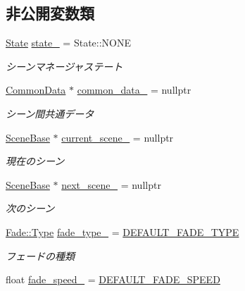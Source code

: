 \subsection*{非公開変数類}
\begin{DoxyCompactItemize}
\item 
\mbox{\hyperlink{class_scene_manager_a68d32794fe1ce945c6a6c380c11a08eb}{State}} \mbox{\hyperlink{class_scene_manager_adf81d8a63dee92bfe5bb934903542bec}{state\+\_\+}} = State\+::\+N\+O\+NE
\begin{DoxyCompactList}\small\item\em シーンマネージャステート \end{DoxyCompactList}\item 
\mbox{\hyperlink{class_scene_manager_1_1_common_data}{Common\+Data}} $\ast$ \mbox{\hyperlink{class_scene_manager_a5f0f0da3d7f9a8a94f0b5a20c3a4908a}{common\+\_\+data\+\_\+}} = nullptr
\begin{DoxyCompactList}\small\item\em シーン間共通データ \end{DoxyCompactList}\item 
\mbox{\hyperlink{class_scene_base}{Scene\+Base}} $\ast$ \mbox{\hyperlink{class_scene_manager_a62dd6d9d807f0a7f2ea4d014126b765e}{current\+\_\+scene\+\_\+}} = nullptr
\begin{DoxyCompactList}\small\item\em 現在のシーン \end{DoxyCompactList}\item 
\mbox{\hyperlink{class_scene_base}{Scene\+Base}} $\ast$ \mbox{\hyperlink{class_scene_manager_a7f9bb649125a114715b07154ac3df6ae}{next\+\_\+scene\+\_\+}} = nullptr
\begin{DoxyCompactList}\small\item\em 次のシーン \end{DoxyCompactList}\item 
\mbox{\hyperlink{class_fade_ac06f27215b454aa05b93c236476d6e80}{Fade\+::\+Type}} \mbox{\hyperlink{class_scene_manager_af8e268f4b8f39deb1c23b52c22375d8f}{fade\+\_\+type\+\_\+}} = \mbox{\hyperlink{class_scene_manager_ab87f30ef7e11305bb4e3400b41225c22}{D\+E\+F\+A\+U\+L\+T\+\_\+\+F\+A\+D\+E\+\_\+\+T\+Y\+PE}}
\begin{DoxyCompactList}\small\item\em フェードの種類 \end{DoxyCompactList}\item 
float \mbox{\hyperlink{class_scene_manager_a8c54bc4de81209cb1576337bbbe45a6b}{fade\+\_\+speed\+\_\+}} = \mbox{\hyperlink{class_scene_manager_a58cd446096f95d3e62e7eba16a4096ee}{D\+E\+F\+A\+U\+L\+T\+\_\+\+F\+A\+D\+E\+\_\+\+S\+P\+E\+ED}}

\end{DoxyCompactItemize}
